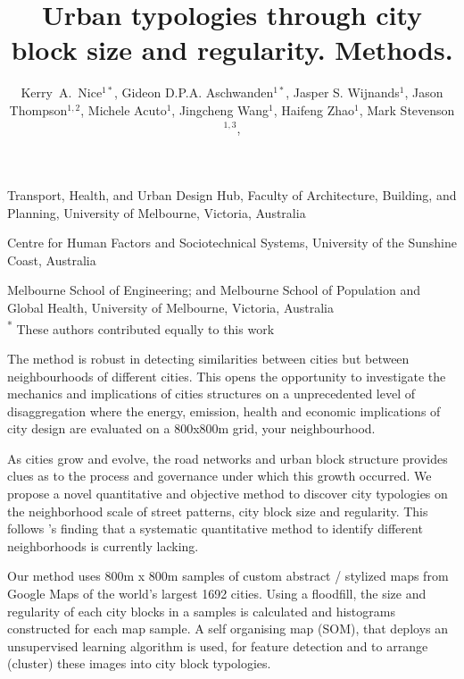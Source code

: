 \documentclass{nature}
\title{Urban typologies through city block size and regularity. Methods.}
\author{Kerry~A.~Nice$^{1*}$,
Gideon D.P.A. Aschwanden$^{1*}$,
Jasper S. Wijnands$^{1}$,
Jason Thompson$^{1,2}$,
Michele Acuto$^{1}$,
Jingcheng Wang$^{1}$,
Haifeng Zhao$^{1}$,
Mark Stevenson$^{1,3}$,
}
\begin{document}
\maketitle

\begin{affiliations}
 \item Transport, Health, and Urban Design Hub, Faculty of Architecture, Building, and Planning, University of Melbourne, Victoria, Australia
 \item Centre for Human Factors and Sociotechnical Systems, University of the Sunshine Coast, Australia
 \item Melbourne School of Engineering; and Melbourne School of Population and Global Health, University of Melbourne, Victoria, Australia
 \\ \textsuperscript{*} These authors contributed equally to this work
\end{affiliations}



The method is robust in detecting similarities between cities but between neighbourhoods of different cities. This opens the opportunity to investigate the mechanics and implications of cities structures on a unprecedented level of disaggregation where the energy, emission, health and economic implications of city design are evaluated on a 800x800m grid, your neighbourhood.



As cities grow and evolve, the road networks and urban block structure provides clues as to the process and governance under which this growth occurred. We propose a novel quantitative and objective method to discover city typologies on the neighborhood scale of street patterns, city block size and regularity. This follows \cite{Louf2014a}'s finding that a systematic quantitative method to identify different neighborhoods is currently lacking. 

Our method uses 800m x 800m samples of custom abstract / stylized maps from Google Maps of the world's largest 1692 cities. Using a floodfill, the size and regularity of each city blocks in a samples is calculated and histograms constructed for each map sample. A self organising map (SOM), that deploys an unsupervised learning algorithm is used, for feature detection and to arrange (cluster) these images into city block typologies. 
\end{document}
